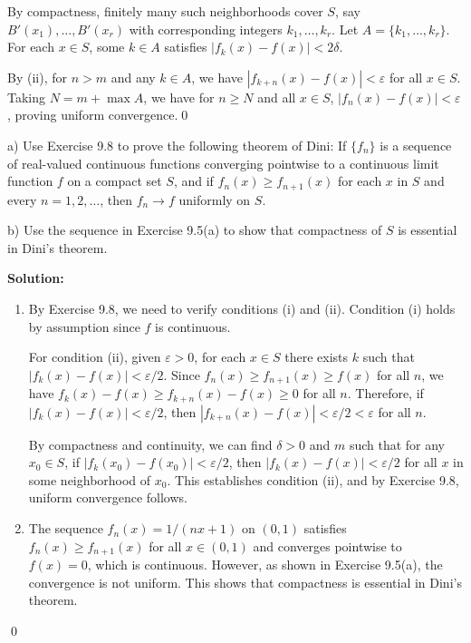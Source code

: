 By compactness, finitely many such neighborhoods cover \( S \), say \( B'(x_1), \ldots, B'(x_r) \) with corresponding integers \( k_1, \ldots, k_r \). Let \( A = \{k_1, \ldots, k_r\} \). For each \( x \in S \), some \( k \in A \) satisfies \( |f_k(x) - f(x)| < 2\delta \).

By (ii), for \( n > m \) and any \( k \in A \), we have \( |f_{k+n}(x) - f(x)| < \varepsilon \) for all \( x \in S \). Taking \( N = m + \max A \), we have for \( n \geq N \) and all \( x \in S \), \( |f_n(x) - f(x)| < \varepsilon \), proving uniform convergence.\qed


\begin{problembox}
a) Use Exercise 9.8 to prove the following theorem of Dini: If \( \{f_n\} \) is a sequence of real-valued continuous functions converging pointwise to a continuous limit function \( f \) on a compact set \( S \), and if \( f_n(x) \geq f_{n+1}(x) \) for each \( x \) in \( S \) and every \( n = 1, 2, \ldots \), then \( f_n \to f \) uniformly on \( S \).

b) Use the sequence in Exercise 9.5(a) to show that compactness of \( S \) is essential in Dini's theorem.
\end{problembox}

\noindent\textbf{Solution:}
\begin{enumerate}[label=(\alph*)]
\item By Exercise 9.8, we need to verify conditions (i) and (ii). Condition (i) holds by assumption since \( f \) is continuous.

For condition (ii), given \( \varepsilon > 0 \), for each \( x \in S \) there exists \( k \) such that \( |f_k(x) - f(x)| < \varepsilon/2 \). Since \( f_n(x) \geq f_{n+1}(x) \geq f(x) \) for all \( n \), we have \( f_k(x) - f(x) \geq f_{k+n}(x) - f(x) \geq 0 \) for all \( n \). Therefore, if \( |f_k(x) - f(x)| < \varepsilon/2 \), then \( |f_{k+n}(x) - f(x)| < \varepsilon/2 < \varepsilon \) for all \( n \).

By compactness and continuity, we can find \( \delta > 0 \) and \( m \) such that for any \( x_0 \in S \), if \( |f_k(x_0) - f(x_0)| < \varepsilon/2 \), then \( |f_k(x) - f(x)| < \varepsilon/2 \) for all \( x \) in some neighborhood of \( x_0 \). This establishes condition (ii), and by Exercise 9.8, uniform convergence follows.

\item The sequence \( f_n(x) = 1/(nx + 1) \) on \( (0, 1) \) satisfies \( f_n(x) \geq f_{n+1}(x) \) for all \( x \in (0, 1) \) and converges pointwise to \( f(x) = 0 \), which is continuous. However, as shown in Exercise 9.5(a), the convergence is not uniform. This shows that compactness is essential in Dini's theorem.
\end{enumerate}\qed



